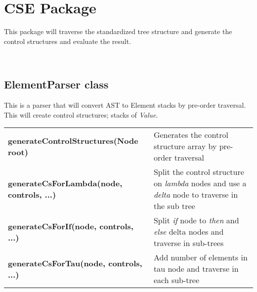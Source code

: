 \documentclass[12pt,a4paper]{article}
\begin{document}
\section{CSE Package}

This package will traverse the standardized tree
structure and generate the control structures and evaluate the result.\\

 \\

\newpage
\subsection{ElementParser class}

This is a parser that will convert AST to Element stacks by pre-order traversal. This will create control structures; stacks of \textit{Value}.\\

\begin{tabular}{lp{9cm}}
    \textbf{generateControlStructures(Node root)} &  Generates the control structure array by pre-order traversal\\
    \textbf{generateCsForLambda(node, controls, ...)} & Split the control structure on \textit{lambda} nodes and use a \textit{delta} node to traverse in the sub tree \\
    \textbf{generateCsForIf(node, controls, ...)} & Split \textit{if} node to \textit{then} and \textit{else} delta nodes and traverse in sub-trees \\
    \textbf{generateCsForTau(node, controls, ...)} & Add number of elements in tau node and traverse in each sub-tree\\
\end{tabular} \\ \\
\end{document}
